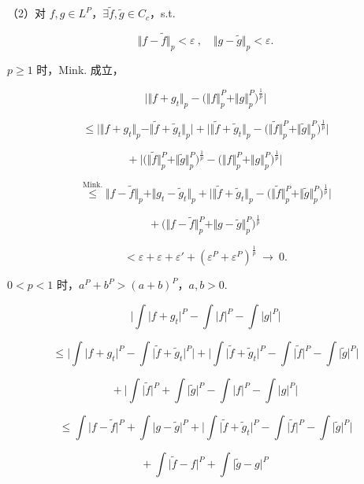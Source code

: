 \documentclass[11pt]{ctexart}
\theoremstyle{definition}
\begin{document}
（2）对 $f, g \in L^P$，$\exists \widetilde{f}, \widetilde{g} \in C_c$，s.t.

\[
\Vert f - \widetilde{f}\Vert_p < \varepsilon \ ,\quad \Vert g - \widetilde{g}\Vert_p < \varepsilon.
\]

$p \geq 1$ 时，Mink. 成立，

\[
\Big\vert \Vert f + g_t\Vert_p - \big(\Vert f\Vert_p^P + \Vert g\Vert_p^P\big)^{\frac{1}{p}} \Big\vert
\]

\[
\leq \Big\vert \Vert f + g_t\Vert_p - \Vert \widetilde{f} + \widetilde{g}_t\Vert_p \Big\vert + \Big\vert \Vert \widetilde{f} + \widetilde{g}_t\Vert_p - \big(\Vert \widetilde{f}\Vert_p^P + \Vert \widetilde{g}\Vert_p^P\big)^{\frac{1}{p}} \Big\vert
\]

\[
+\ \Big\vert \big(\Vert \widetilde{f}\Vert_p^P + \Vert \widetilde{g}\Vert_p^P\big)^{\frac{1}{p}} - \big(\Vert f\Vert_p^P + \Vert g\Vert_p^P\big)^{\frac{1}{p}} \Big\vert
\]

\[
\overset{\text{Mink.}}{\leq} \Vert f - \widetilde{f}\Vert_p + \Vert g_t - \widetilde{g}_t\Vert_p + \Big\vert \Vert \widetilde{f} + \widetilde{g}_t\Vert_p - \big(\Vert \widetilde{f}\Vert_p^P + \Vert \widetilde{g}\Vert_p^P\big)^{\frac{1}{p}} \Big\vert
\]

\[
+\ \big( \Vert f - \widetilde{f}\Vert_p^P + \Vert g - \widetilde{g}\Vert_p^P \big)^{\frac{1}{p}}
\]

\[
< \varepsilon + \varepsilon + \varepsilon' + (\varepsilon^P + \varepsilon^P)^{\frac{1}{p}} \ \to\ 0.
\]

$0 < p < 1$ 时，$a^P + b^P > (a + b)^P$，$a, b > 0$.

\[
\Big\vert \int \vert f + g_t\vert^P - \int \vert f\vert^P - \int \vert g\vert^P \Big\vert
\]

\[
\leq \Big\vert \int \vert f + g_t\vert^P - \int \vert \widetilde{f} + \widetilde{g}_t\vert^P \Big\vert + \Big\vert \int \vert \widetilde{f} + \widetilde{g}_t\vert^P - \int \vert \widetilde{f}\vert^P - \int \vert \widetilde{g}\vert^P \Big\vert
\]

\[
+\ \Big\vert \int \vert \widetilde{f}\vert^P + \int \vert \widetilde{g}\vert^P - \int \vert f\vert^P - \int \vert g\vert^P \Big\vert
\]

\[
\leq \int \vert f - \widetilde{f}\vert^P + \int \vert g - \widetilde{g}\vert^P + \Big\vert \int \vert \widetilde{f} + \widetilde{g}_t\vert^P - \int \vert \widetilde{f}\vert^P - \int \vert \widetilde{g}\vert^P \Big\vert
\]

\[
+\ \int \vert \widetilde{f} - f\vert^P + \int \vert \widetilde{g} - g\vert^P
\]
\end{document}
